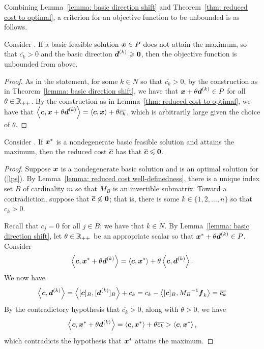 Combining Lemma~\ref{lemma: basic direction shift} and Theorem~\ref{thm: reduced cost to optimal}, a criterion for an objective function to be unbounded is as follows. 
\begin{corollary}\label{cor: unboundedness criterion}
Consider \LPSA. If a basic feasible solution ${\boldsymbol x}\in P$ does not attain the maximum, so that $\overline{c_k} > 0$ and the basic direction ${\boldsymbol d}^{(k)} \geqslant \boldsymbol0$, then the objective function is unbounded from above. 
\end{corollary}
\begin{proof}
As in the statement, for some $k \in N$ so that $\overline{c_k} > 0$, by the construction as in Theorem~\ref{lemma: basic direction shift}, we have that ${\boldsymbol x} + \theta {\boldsymbol d}^{(k)} \in P$ for all $\theta \in \mathbb R_{++}$. By the construction as in Lemma~\ref{thm: reduced cost to optimal}, we have that $\left\langle{\boldsymbol c}, {\boldsymbol x} + \theta {\boldsymbol d}^{(k)}\right\rangle = \left\langle{\boldsymbol c}, {\boldsymbol x}\right\rangle + \theta\overline{c_k}$, which is arbitrarily large given the choice of $\theta$.  
\end{proof}

\begin{theorem}\label{thm: optimal reduced cost}
Consider \LPSA. If ${\boldsymbol x}^\ast$ is a nondegenerate basic feasible solution and attains the maximum, then the reduced cost $\overline{{\boldsymbol c}}$ has that $\overline{{\boldsymbol c}} \leqslant \boldsymbol0$. 
\end{theorem}
\begin{proof}
Suppose ${\boldsymbol x}$ is a nondegenerate basic solution and is an optimal solution for (\ref{lps}). By Lemma~\ref{lemma: reduced cost well-definedness}, there is a unique index set $B$ of cardinality $m$ so that $M_B$ is an invertible submatrix. 
Toward a contradiction, suppose that $\overline{{\boldsymbol c}}\not\leqslant \boldsymbol0$; that is, there is some $k\in\{1,2,\dots, n\}$ so that $c_k > 0$. 

Recall that $c_j = 0$ for all $j \in B$; we have that $k \in N$. By Lemma~\ref{lemma: basic direction shift}, let $\theta\in\mathbb R_{++}$ be an appropriate scalar so that ${\boldsymbol x}^\ast + \theta {\boldsymbol d}^{(k)} \in P$. Consider 
\[ \left\langle {\boldsymbol c}, {\boldsymbol x}^\ast + \theta {\boldsymbol d}^{(k)} \right\rangle =  \left\langle {\boldsymbol c}, {\boldsymbol x}^\ast \right\rangle + \theta \left\langle {\boldsymbol c},  {\boldsymbol d}^{(k)} \right\rangle. \]
We now have 
\[ \left\langle{\boldsymbol c}, {\boldsymbol d}^{(k)}\right\rangle = \left\langle[{\boldsymbol c}]_B, [{\boldsymbol d}^{(k)}]_B\right\rangle  + c_k =  c_k - \left\langle[{\boldsymbol c}]_B, {M_B}^{-1}{\boldsymbol f}_k  \right\rangle = \overline{c_k} \]
By the contradictory hypothesis that $\overline{c_k} > 0$, along with $\theta>0$, we have
\[ \left\langle {\boldsymbol c}, {\boldsymbol x}^\ast + \theta {\boldsymbol d}^{(k)} \right\rangle =  \left\langle {\boldsymbol c}, {\boldsymbol x}^\ast \right\rangle + \theta \overline{c_k} >  \left\langle {\boldsymbol c}, {\boldsymbol x}^\ast \right\rangle, \]
which contradicts the hypothesis that ${\boldsymbol x}^\ast$ attains the maximum. 
\end{proof}


